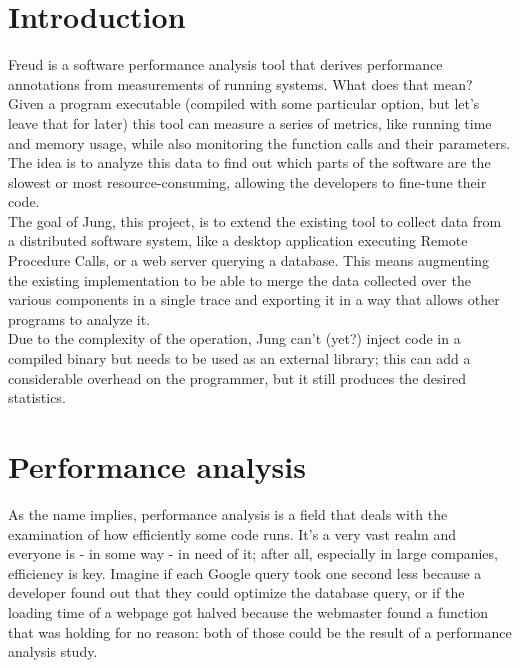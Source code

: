 \chapter{Introduction}

    Freud \cite{freud} is a software performance analysis tool that derives performance annotations
    from measurements of running systems. What does that mean? Given a program executable (compiled
    with some particular option, but let's leave that for later) this tool can measure a series of 
    metrics, like running time and memory usage, while also monitoring the function calls and their
    parameters. The idea is to analyze this data to find out which parts of the software are the 
    slowest or most resource-consuming, allowing the developers to fine-tune their code.\\

    The goal of Jung, this project, is to extend the existing tool to collect data from a
    distributed software system, like a desktop application executing Remote Procedure Calls,
    or a web server querying a database. This means augmenting the existing implementation to
    be able to merge the data collected over the various components in a single trace and
    exporting it in a way that allows other programs to analyze it.\\

    Due to the complexity of the operation, Jung can't (yet?) inject code in a compiled binary
    but needs to be used as an external library; this can add a considerable overhead on the
    programmer, but it still produces the desired statistics.


\chapter{Performance analysis}


    As the name implies, performance analysis is a field that deals with the examination of
    how efficiently some code runs. It's a very vast realm and everyone is - in some
    way - in need of it; after all, especially in large companies, efficiency is key. Imagine if
    each Google query took one second less because a developer found out that they could
    optimize the database query, or if the loading time of a webpage got halved because the
    webmaster found a function that was holding for no reason: both of those could be the result
    of a performance analysis study.\\

